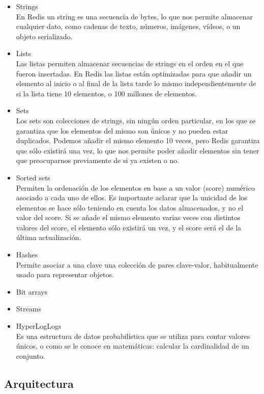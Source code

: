 \documentclass[twocolumn]{article}
\begin{document}
\begin{itemize}
  \item Strings
  \\En Redis un string es una secuencia de bytes, lo que nos permite almacenar cualquier dato, como cadenas de texto, números, imágenes, vídeos, o un objeto serializado.
  \item Lists
  \\Las listas permiten almacenar secuencias de strings en el orden en el que fueron insertadas. En Redis las listas están optimizadas para que añadir un elemento al inicio o al final de la lista tarde lo mismo independientemente de si la lista tiene 10 elementos, o 100 millones de elementos.
  \item Sets
  \\Los sets son colecciones de strings, sin ningún orden particular, en los que se garantiza que los elementos del mismo son únicos y no pueden estar duplicados. Podemos añadir el mismo elemento 10 veces, pero Redis garantiza que sólo existirá una vez, lo que nos permite poder añadir elementos sin tener que preocuparnos previamente de si ya existen o no.
  \item Sorted sets
 \\Permiten la ordenación de los elementos en base a un valor (score) numérico asociado a cada uno de ellos. Es importante aclarar que la unicidad de los elementos se hace sólo teniendo en cuenta los datos almacenados, y no el valor del score. Si se añade el mismo elemento varias veces con distintos valores del score, el elemento sólo existirá un vez, y el score será el de la última actualización.
  \item Hashes
  \\Permite asociar a una clave una colección de pares clave-valor, habitualmente usado para representar objetos.
  \item Bit arrays
  
  \item Streams
  
  \item HyperLogLogs
\\Es una estructura de datos probabilística que se utiliza para contar valores únicos, o como se le conoce en matemáticas: calcular la cardinalidad de un conjunto.
\end{itemize}

\subsection{Arquitectura}
\end{document}
